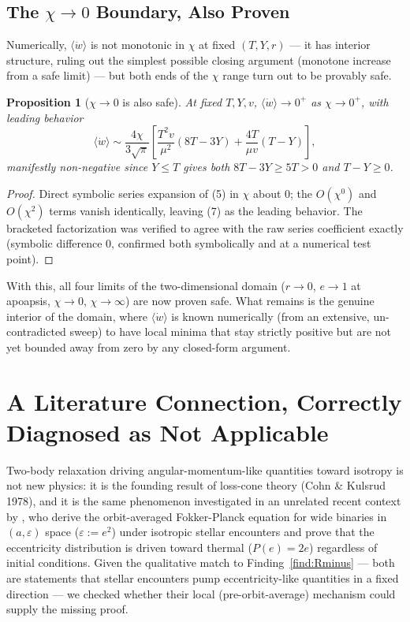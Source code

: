 \documentclass[12pt]{amsart}
\theoremstyle{plain}
\newtheorem{proposition}[theorem]{Proposition}
\theoremstyle{remark}
\begin{document}
\subsection{The $\chi\to0$ Boundary, Also Proven}

Numerically, $\langle\dot w\rangle$ is not monotonic in $\chi$ at fixed $(T,Y,r)$ --- it has interior structure, ruling out the simplest possible closing argument (monotone increase from a safe limit) --- but both ends of the $\chi$ range turn out to be provably safe.

\begin{proposition}[$\chi\to0$ is also safe]\label{prop:chi0}
At fixed $T,Y,v$, $\langle\dot w\rangle\to0^+$ as $\chi\to0^+$, with leading behavior
\begin{equation}
\langle\dot w\rangle \sim \frac{4\chi}{3\sqrt\pi}\left[\frac{T^2v}{\mu^2}(8T-3Y) + \frac{4T}{\mu v}(T-Y)\right], \tag{7}
\end{equation}
manifestly non-negative since $Y\leq T$ gives both $8T-3Y\geq5T>0$ and $T-Y\geq0$.
\end{proposition}

\begin{proof}
Direct symbolic series expansion of (5) in $\chi$ about $0$; the $O(\chi^0)$ and $O(\chi^2)$ terms vanish identically, leaving (7) as the leading behavior. The bracketed factorization was verified to agree with the raw series coefficient exactly (symbolic difference $0$, confirmed both symbolically and at a numerical test point).
\end{proof}

With this, all four limits of the two-dimensional domain ($r\to0$, $e\to1$ at apoapsis, $\chi\to0$, $\chi\to\infty$) are now proven safe. What remains is the genuine interior of the domain, where $\langle\dot w\rangle$ is known numerically (from an extensive, un-contradicted sweep) to have local minima that stay strictly positive but are not yet bounded away from zero by any closed-form argument.

\section{A Literature Connection, Correctly Diagnosed as Not Applicable}

Two-body relaxation driving angular-momentum-like quantities toward isotropy is not new physics: it is the founding result of loss-cone theory (Cohn \& Kulsrud 1978), and it is the same phenomenon investigated in an unrelated recent context by \cite{HamiltonModak2024}, who derive the orbit-averaged Fokker-Planck equation for wide binaries in $(a,\varepsilon)$ space ($\varepsilon:=e^2$) under isotropic stellar encounters and prove that the eccentricity distribution is driven toward thermal ($P(e)=2e$) regardless of initial conditions. Given the qualitative match to Finding~\ref{find:Rminus} --- both are statements that stellar encounters pump eccentricity-like quantities in a fixed direction --- we checked whether their local (pre-orbit-average) mechanism could supply the missing proof.
\end{document}
